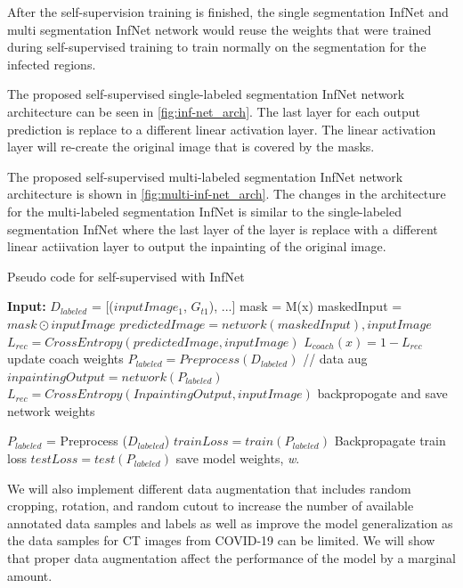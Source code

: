 After the self-supervision training is finished, the single segmentation InfNet and multi segmentation InfNet network would reuse the weights that were trained during self-supervised training to train normally on the segmentation for the infected regions.

The proposed self-supervised single-labeled segmentation InfNet network architecture can be seen in \ref{fig:inf-net_arch}. The last layer for each output prediction is replace to a different linear activation layer. The linear activation layer will re-create the original image that is covered by the masks. 

The proposed self-supervised multi-labeled segmentation InfNet network architecture is shown in \ref{fig:multi-inf-net_arch}. The changes in the architecture for the multi-labeled segmentation InfNet is similar to the single-labeled segmentation InfNet where the last layer of the layer is replace with a different linear actiivation layer to output the inpainting of the original image. 


\begin{algorithm}
	\caption{Pseudo code for self-supervised with InfNet}
	\label{alg:self-inf-net}
	\begin{algorithmic}
		\STATE \textbf{Input:} $D_{labeled}$ = [($inputImage_1$, $G_{t1}$), ...]
		\STATE mask = M(x)
		\STATE maskedInput = $mask \odot inputImage$
		\STATE $ predictedImage =network(maskedInput), inputImage$
		\STATE $L_{rec} = CrossEntropy(predictedImage, inputImage)$
		\STATE $L_{coach}(x) = 1 - L_{rec}$
		\STATE update coach weights
		\ENDFOR
		\STATE $P_{labeled} = Preprocess(D_{labeled})$ // data aug
		\STATE $inpaintingOutput = network(P_{labeled})$
		\STATE $L_{rec} = CrossEntropy(InpaintingOutput, inputImage)$
		\STATE backpropogate and save network weights
		\ENDFOR
		\ENDFOR 
		
		
		\STATE $P_{labeled}$ = Preprocess ($D_{labeled}$)
		\STATE $trainLoss = train(P_{labeled})$
		\STATE Backpropagate train loss
		\STATE $testLoss = test(P_{labeled})$
		\STATE save model weights, \textit{w}.
		\ENDFOR
	\end{algorithmic}
\end{algorithm}

We will also implement different data augmentation that includes random cropping, rotation, and random cutout \cite{ref7,ref15,ref16} to increase the number of available annotated data samples and labels as well as improve the model generalization as the data samples for CT images from COVID-19 can be limited. We will show that proper data augmentation affect the performance of the model by a marginal amount.

